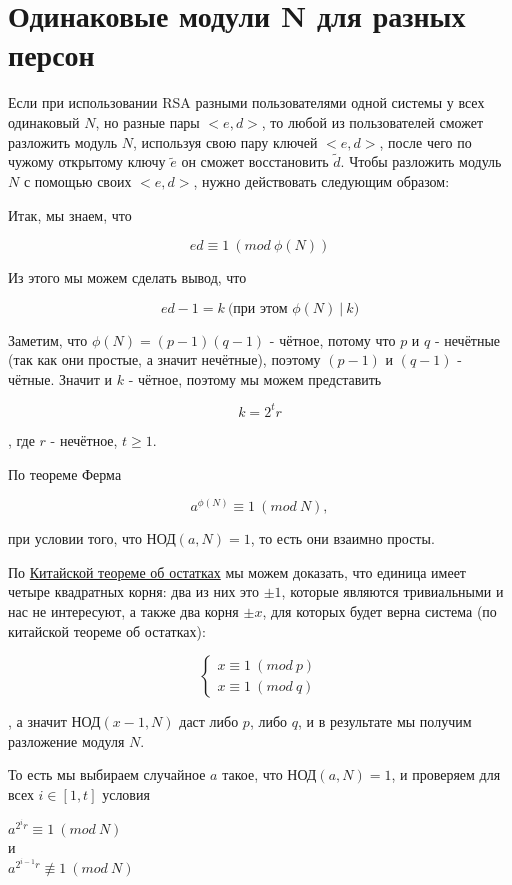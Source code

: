 \documentclass[12pt,a4paper]{scrartcl}
\begin{document}
\section{Одинаковые модули N для разных персон}

Если при использовании RSA разными пользователями одной системы у всех одинаковый $N$, но разные пары $<e,d>$, то любой из пользователей сможет разложить модуль $N$, используя свою пару ключей $<e,d>$, после чего по чужому открытому ключу $\widetilde{e}$ он сможет восстановить  $\widetilde{d}$. Чтобы разложить модуль $N$ с помощью своих $<e,d>$, нужно действовать следующим образом:

Итак, мы знаем, что 

$$ed \equiv 1\ (mod\ \phi(N))$$

Из этого мы можем сделать вывод, что 

$$ed - 1 = k\ \text{(при этом }\phi(N)\ |\ k)$$

Заметим, что $\phi(N)=(p-1)(q-1)$ - чётное, потому что $p$ и $q$ - нечётные (так как они простые, а значит нечётные), поэтому $(p-1)$ и $(q-1)$ - чётные. Значит и $k$ - чётное, поэтому мы можем представить 

$$k=2^tr$$

, где $r$ - нечётное, $t \geq 1$.

По теореме Ферма 

$$a^{\phi(N)} \equiv 1\ (mod\ N),$$

при условии того, что НОД$(a,N)=1$, то есть они взаимно просты.


По \href{https://yatb.kksctf.ru/}{Китайской теореме об остатках} мы можем доказать, что единица имеет четыре квадратных корня: два из них это $\pm1$, которые являются тривиальными и нас не интересуют, а также два корня $\pm x$, для которых будет верна система (по китайской теореме об остатках):

$$\begin{cases} x \equiv 1\ (mod\ p) \\ x \equiv 1\ (mod\ q) \end{cases}$$

, а значит НОД$(x-1,N)$ даст либо $p$, либо $q$, и в результате мы получим разложение модуля $N$.

То есть мы выбираем случайное $a$ такое, что НОД$(a,N)=1$, и проверяем для всех $i \in [1,t]$ условия 

\begin{center}
	$a^{2^ir} \equiv 1\ (mod\ N)$\\
	и\\
	$a^{2^{i-1}r} \not\equiv 1\ (mod\ N)$
\end{center}
\end{document}
